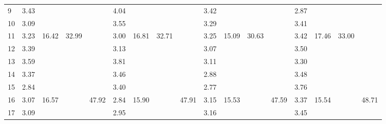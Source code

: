 \begin{center}
\begin{tabular}{| l || c | c | c | c | c | c | c | c | c | c | c | c | c | c | c | c |}
9 & \multirow{1}{*}{ 3.43 }  & & & & \multirow{1}{*}{ 4.04 }  & & & & \multirow{1}{*}{ 3.42 }  & & & & \multirow{1}{*}{ 2.87 }  & & & \\\cline{2-2}\cline{6-6}\cline{10-10}\cline{14-14}
10 & \multirow{1}{*}{ 3.09 }  & & & & \multirow{1}{*}{ 3.55 }  & & & & \multirow{1}{*}{ 3.29 }  & & & & \multirow{1}{*}{ 3.41 }  & & & \\\cline{2-2}\cline{6-6}\cline{10-10}\cline{14-14}\cline{3-3}\cline{7-7}\cline{11-11}\cline{15-15}\cline{4-4}\cline{8-8}\cline{12-12}\cline{16-16}
11 & \multirow{1}{*}{ 3.23 }  & \multirow{5}{*}{ 16.42 }  & \multirow{10}{*}{ 32.99 }  & & \multirow{1}{*}{ 3.00 }  & \multirow{5}{*}{ 16.81 }  & \multirow{10}{*}{ 32.71 }  & & \multirow{1}{*}{ 3.25 }  & \multirow{5}{*}{ 15.09 }  & \multirow{10}{*}{ 30.63 }  & & \multirow{1}{*}{ 3.42 }  & \multirow{5}{*}{ 17.46 }  & \multirow{10}{*}{ 33.00 }  & \\\cline{2-2}\cline{6-6}\cline{10-10}\cline{14-14}
12 & \multirow{1}{*}{ 3.39 }  & & & & \multirow{1}{*}{ 3.13 }  & & & & \multirow{1}{*}{ 3.07 }  & & & & \multirow{1}{*}{ 3.50 }  & & & \\\cline{2-2}\cline{6-6}\cline{10-10}\cline{14-14}
13 & \multirow{1}{*}{ 3.59 }  & & & & \multirow{1}{*}{ 3.81 }  & & & & \multirow{1}{*}{ 3.11 }  & & & & \multirow{1}{*}{ 3.30 }  & & & \\\cline{2-2}\cline{6-6}\cline{10-10}\cline{14-14}
14 & \multirow{1}{*}{ 3.37 }  & & & & \multirow{1}{*}{ 3.46 }  & & & & \multirow{1}{*}{ 2.88 }  & & & & \multirow{1}{*}{ 3.48 }  & & & \\\cline{2-2}\cline{6-6}\cline{10-10}\cline{14-14}
15 & \multirow{1}{*}{ 2.84 }  & & & & \multirow{1}{*}{ 3.40 }  & & & & \multirow{1}{*}{ 2.77 }  & & & & \multirow{1}{*}{ 3.76 }  & & & \\\cline{2-2}\cline{6-6}\cline{10-10}\cline{14-14}\cline{3-3}\cline{7-7}\cline{11-11}\cline{15-15}\cline{5-5}\cline{9-9}\cline{13-13}\cline{17-17}
16 & \multirow{1}{*}{ 3.07 }  & \multirow{5}{*}{ 16.57 }  & & \multirow{15}{*}{ 47.92 }  & \multirow{1}{*}{ 2.84 }  & \multirow{5}{*}{ 15.90 }  & & \multirow{15}{*}{ 47.91 }  & \multirow{1}{*}{ 3.15 }  & \multirow{5}{*}{ 15.53 }  & & \multirow{15}{*}{ 47.59 }  & \multirow{1}{*}{ 3.37 }  & \multirow{5}{*}{ 15.54 }  & & \multirow{15}{*}{ 48.71 }  \\\cline{2-2}\cline{6-6}\cline{10-10}\cline{14-14}
17 & \multirow{1}{*}{ 3.09 }  & & & & \multirow{1}{*}{ 2.95 }  & & & & \multirow{1}{*}{ 3.16 }  & & & & \multirow{1}{*}{ 3.45 }  & & & \\\cline{2-2}\cline{6-6}\cline{10-10}\cline{14-14}

\end{tabular}
\end{center}
